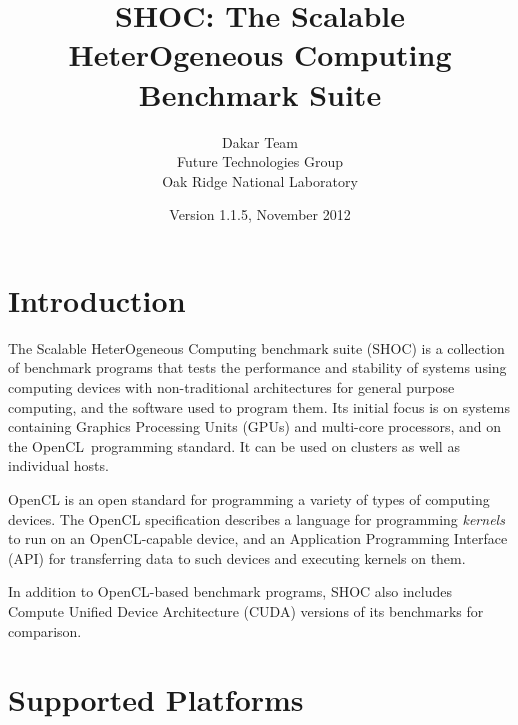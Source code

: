 \documentclass[11pt]{article}
\begin{document}
\title{SHOC: The Scalable HeterOgeneous Computing Benchmark Suite}
\author{Dakar Team\\Future Technologies Group\\Oak Ridge National Laboratory}
\date{Version 1.1.5, November 2012}
\maketitle

\section{Introduction}

The Scalable HeterOgeneous Computing benchmark suite (SHOC) is a collection of
benchmark programs that tests the performance and stability of systems using 
computing devices with non-traditional architectures for general purpose 
computing, and the software used to program them. Its initial focus is on 
systems containing Graphics Processing Units (GPUs) and multi-core 
processors, and on the OpenCL\,\cite{openclspec} programming standard.
It can be used on clusters as well as individual hosts.

OpenCL is an open standard for programming a variety of types of computing 
devices. The OpenCL specification describes a language for programming 
\emph{kernels} to run on an OpenCL-capable device, and an 
Application Programming Interface (API) for transferring data to such 
devices and executing kernels on them. 


In addition to OpenCL-based benchmark programs, SHOC also includes
Compute Unified Device Architecture (CUDA)\cite{cuda} versions
of its benchmarks for comparison.



\section{Supported Platforms}\label{sec:supported}
\end{document}
